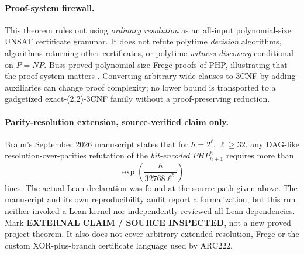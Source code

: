 \documentclass[11pt]{article}
\begin{document}
\paragraph{Proof-system firewall.} This theorem rules out using \emph{ordinary resolution} as an all-input polynomial-size UNSAT certificate grammar. It does not refute polytime \emph{decision} algorithms, algorithms returning other certificates, or polytime \emph{witness discovery} conditional on $P=NP$. Buss proved polynomial-size Frege proofs of PHP, illustrating that the proof system matters \cite{buss1987}. Converting arbitrary wide clauses to 3CNF by adding auxiliaries can change proof complexity; no lower bound is transported to a gadgetized exact-(2,2)-3CNF family without a proof-preserving reduction.

\paragraph{Parity-resolution extension, source-verified claim only.}
Braun's September 2026 manuscript \cite{braun2026} states that for $h=2^\ell$, $\ell\ge32$, any DAG-like resolution-over-parities refutation of the \emph{bit-encoded} $PHP_{h+1}^{h}$ requires more than
\[
 \exp\left(\frac{h}{32768\ell^2}\right)
\]
lines. The actual Lean declaration  was found at the source path given above. The manuscript and its own reproducibility audit report a formalization, but this run neither invoked a Lean kernel nor independently reviewed all Lean dependencies. Mark \textbf{EXTERNAL CLAIM / SOURCE INSPECTED}, not a new proved project theorem. It also does not cover arbitrary extended resolution, Frege or the custom XOR-plus-branch certificate language used by ARC222.
\end{document}
